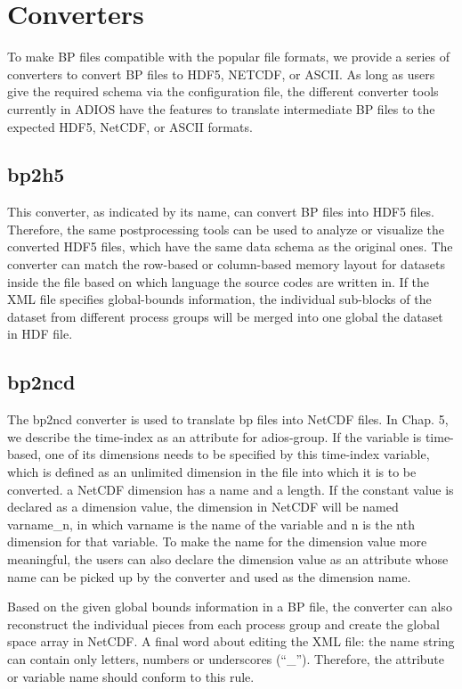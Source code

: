 \chapter{Converters}

To make BP files compatible with the popular file formats, we provide a series 
of converters to convert BP files to HDF5, NETCDF, or ASCII. As long as users give 
the required schema via the configuration file, the different converter tools currently 
in ADIOS have the features to translate intermediate BP files to the expected HDF5, 
NetCDF, or ASCII formats.

\section{bp2h5}

This converter, as indicated by its name, can convert BP files into HDF5 files. 
Therefore, the same postprocessing tools can be used to analyze or visualize the 
converted HDF5 files, which have the same data schema as the original ones. The 
converter can match the row-based or column-based memory layout for datasets inside 
the file based on which language the source codes are written in.  If the XML file 
specifies global-bounds information, the individual sub-blocks of the dataset from 
different process groups will be merged into one global the dataset in HDF file.

\section{bp2ncd}

The bp2ncd converter is used to translate bp files into NetCDF files. In Chap. 
5, we describe the time-index as an attribute for adios-group. If the variable 
is time-based, one of its dimensions needs to be specified by this time-index variable, 
which is defined as an unlimited dimension in the file into which it is to be converted. 
a NetCDF dimension has a name and a length. If the constant value is declared as 
a dimension value, the dimension in NetCDF will be named varname\_n, in which varname 
is the name of the variable and n is the nth dimension for that variable. To make 
the name for the dimension value more meaningful, the users can also declare the 
dimension value as an attribute whose name can be picked up by the converter and 
used as the dimension name.

Based on the given global bounds information in a BP file, the converter can also 
reconstruct the individual pieces from each process group and create the global 
space array in NetCDF. A final word about editing the XML file: the name string 
can contain only letters, numbers or underscores (``\_''). Therefore, the attribute 
or variable name should conform to this rule. 


